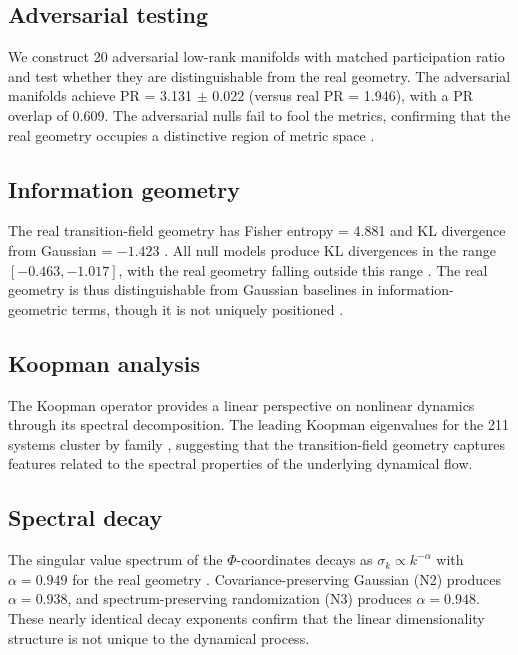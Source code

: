 \documentclass[aip,chaos,showpacs,superscriptaddress,groupedaddress]{revtex4-1}
\begin{document}
\subsection{Adversarial testing}
\label{sec:adversarial}

We construct 20 adversarial low-rank manifolds with matched participation ratio \cite{costa2007intrinsic} and test whether they are distinguishable from the real geometry. The adversarial manifolds achieve PR = 3.131 $\pm$ 0.022 (versus real PR = 1.946), with a PR overlap of 0.609. The adversarial nulls fail to fool the metrics, confirming that the real geometry occupies a distinctive region of metric space \cite{memoli2011gromov}.

\subsection{Information geometry}
\label{sec:info_geometry}

The real transition-field geometry has Fisher entropy = 4.881 and KL divergence from Gaussian = $-1.423$ \cite{amari1982differential}. All null models produce KL divergences in the range $[-0.463, -1.017]$, with the real geometry falling outside this range \cite{cover1991elements}. The real geometry is thus distinguishable from Gaussian baselines in information-geometric terms, though it is not uniquely positioned \cite{ay2017information}.

\subsection{Koopman analysis}
\label{sec:koopman}

The Koopman operator \cite{koopman1931hamiltonian, mezic2013analysis} provides a linear perspective on nonlinear dynamics through its spectral decomposition. The leading Koopman eigenvalues for the 211 systems cluster by family \cite{brunton2021data, kutz2017dynamic}, suggesting that the transition-field geometry captures features related to the spectral properties of the underlying dynamical flow.

\subsection{Spectral decay}
\label{sec:spectral}

The singular value spectrum of the $\Phi$-coordinates decays as $\sigma_k \propto k^{-\alpha}$ with $\alpha = 0.949$ for the real geometry \cite{albano1988singular}. Covariance-preserving Gaussian (N2) produces $\alpha = 0.938$, and spectrum-preserving randomization (N3) produces $\alpha = 0.948$. These nearly identical decay exponents confirm that the linear dimensionality structure is not unique to the dynamical process.
\end{document}

